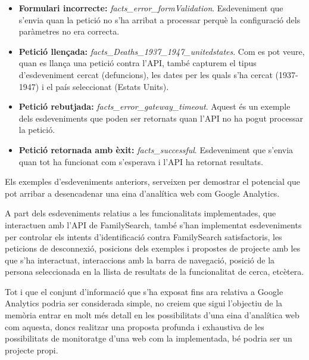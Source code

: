     \begin{itemize}
        \item \textbf{Formulari incorrecte:} \emph{facts\_error\_formValidation}. Esdeveniment que s'envia quan la petició no s'ha arribat a processar perquè la configuració dels paràmetres no era correcta.
        \item \textbf{Petició llençada:} \emph{facts\_Deaths\_1937\_1947\_unitedstates}. Com es pot veure, quan es llança una petició contra l'API, també capturem el tipus d'esdeveniment cercat (defuncions), les dates per les quals s'ha cercat (1937-1947) i el país seleccionat (Estats Units).
        \item \textbf{Petició rebutjada:} \emph{facts\_error\_gateway\_timeout}. Aquest és un exemple dels esdeveniments que poden ser retornats quan l'API no ha pogut processar la petició.
        \item \textbf{Petició retornada amb èxit:} \emph{facts\_successful}. Esdeveniment que s'envia quan tot ha funcionat com s'esperava i l'API ha retornat resultats.
    \end{itemize}

    Els exemples d'esdeveniments anteriors, serveixen per demostrar el potencial que pot arribar a desencadenar una eina d'analítica web com Google Analytics.

    A part dels esdeveniments relatius a les funcionalitats implementades, que interactuen amb l'API de FamilySearch, també s'han implementat esdeveniments per controlar els intents d'identificació contra FamilySearch satisfactoris, les peticions de desconnexió, posicions dels exemples i propostes de projecte amb les que s'ha interactuat, interaccions amb la barra de navegació, posició de la persona seleccionada en la llista de resultats de la funcionalitat de cerca, etcètera.

    Tot i que el conjunt d'informació que s'ha exposat fins ara relativa a Google Analytics podria ser considerada simple, no creiem que sigui l'objectiu de la memòria entrar en molt més detall en les possibilitats d'una eina d'analítica web com aquesta, doncs realitzar una proposta profunda i exhaustiva de les possibilitats de monitoratge d'una web com la implementada, bé podria ser un projecte propi.
